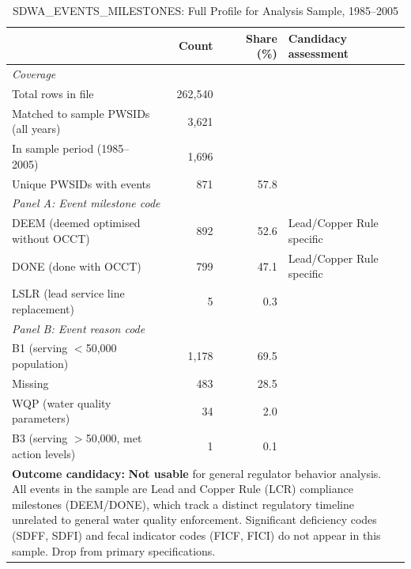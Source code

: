 \begin{table}[h!]
\centering
\caption{SDWA\_EVENTS\_MILESTONES: Full Profile for Analysis Sample, 1985--2005}
\label{tab:profile_milestones}
\small
\begin{tabular}{p{5.5cm}rrl}
\hline\hline
 & Count & Share (\%) & Candidacy assessment \\
\hline
\multicolumn{4}{l}{\textit{Coverage}} \\
Total rows in file & 262,540 & & \\
Matched to sample PWSIDs (all years) & 3,621 & & \\
In sample period (1985--2005) & 1,696 & & \\
Unique PWSIDs with events & 871 & 57.8 & \\[6pt]

\multicolumn{4}{l}{\textit{Panel A: Event milestone code}} \\
DEEM (deemed optimised without OCCT) & 892 & 52.6 & Lead/Copper Rule specific \\
DONE (done with OCCT) & 799 & 47.1 & Lead/Copper Rule specific \\
LSLR (lead service line replacement) & 5 & 0.3 & \\[6pt]

\multicolumn{4}{l}{\textit{Panel B: Event reason code}} \\
B1 (serving $<$50,000 population) & 1,178 & 69.5 & \\
Missing & 483 & 28.5 & \\
WQP (water quality parameters) & 34 & 2.0 & \\
B3 (serving $>$50,000, met action levels) & 1 & 0.1 & \\
\hline\hline
\multicolumn{4}{p{13cm}}{\footnotesize \textbf{Outcome candidacy:} \textbf{Not usable} for general regulator behavior analysis. All events in the sample are Lead and Copper Rule (LCR) compliance milestones (DEEM/DONE), which track a distinct regulatory timeline unrelated to general water quality enforcement. Significant deficiency codes (SDFF, SDFI) and fecal indicator codes (FICF, FICI) do not appear in this sample. Drop from primary specifications.} \\
\end{tabular}
\end{table}


